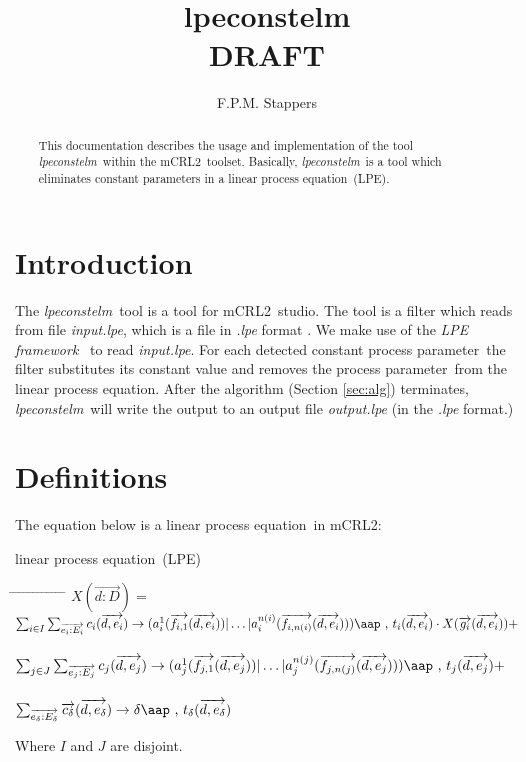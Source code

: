 \index{}\documentclass[a4paper,10pt]{article}
\title{lpeconstelm \\ DRAFT}
\author{F.P.M. Stappers}
\theoremstyle{plain}
\theoremstyle{definition}
\newcommand{\lpe}{linear process equation}
\newcommand{\tool}{\textit{lpeconstelm}}
\newcommand{\ovr}{\overrightarrow}
\newcommand{\mcrl}{mCRL2}
\newcommand{\framework}{\textit{LPE framework} \cite{LPEframework}}
\newcommand{\pp}{process parameter}
\newcommand{\ti}{\textit}
\newcommand{\tab}{\hspace*{5.mm} \= \hspace*{5.mm} \= \hspace*{5.mm} \= \hspace*{5.mm} \= \hspace*{5.mm} \= \hspace*{5.mm}  \= \hspace*{5.mm}  \= \hspace*{5.mm}  \= \hspace*{5.mm} \= \hspace*{5.mm} \= \hspace*{5.mm}  \= \hspace*{5.mm}  \= \hspace*{5.mm}\kill}
\newcommand{\at}[1]{\mbox{\aap ,} #1}
\begin{document}
\maketitle

\begin{abstract}
This documentation describes the usage and implementation of the tool \tool\ within the \mcrl\ toolset.
Basically, \tool\ is a tool which eliminates constant parameters in a \lpe\ (LPE).
\end{abstract}

\tableofcontents

\section{Introduction}
The \tool\ tool is a tool for \mcrl\ studio. The tool is a
filter which reads from file \ti{input.lpe}, which is
a file in \ti{.lpe} format \cite{LPEformat}. We make use of the
\framework\ to read \ti{input.lpe}. For
each detected constant \pp\ the filter substitutes its constant value and removes the \pp\ from the
\lpe . After the algorithm (Section \ref{sec:alg}) terminates, \tool\
will write the output to an output file \ti{output.lpe} (in the \ti{.lpe} format.)

\section{Definitions} \label{sec:def}

The equation below is a \lpe\ in \mcrl : 
\begin{defn}\lpe\ (LPE) \newline
\begin{tabbing}
\tab
$X (\ovr{d: D}) = $ \> \> \> $ \sum_{i \in I} \sum_{\ovr{e_i: E_i}} c_i ( \ovr{d, e_i }) \rightarrow 
(a_i^1 (\ovr{f_{i,1}}(\ovr{d,e_i})) \vert \ldots \vert a_i^{n(i)}(\ovr{f_{i,n(i)}}(\ovr{d,e_i}))) \at \text{ } t_i(\ovr{d,e_i})  \cdot X(\ovr{g_i}(\ovr{d,e_i})) +$ \\ \\
\> \> \> $ \sum_{j \in J} \sum_{\ovr{e_j: E_j}} c_j ( \ovr{d, e_j} ) \rightarrow 
(a_j^1 (\ovr{f_{j,1}}(\ovr{d,e_j})) \vert \ldots \vert a_j^{n(j)}(\ovr{f_{j,n(j)}}(\ovr{d,e_j}))) \at \text{ } t_j(\ovr{d,e_j}) + $ \\ \\
\> \> \> $\sum_{\ovr{e_\delta:E_\delta}} \ovr{c_\delta} ( \ovr{d, e_\delta}) \rightarrow 
\delta \at \text{ } t_\delta(\ovr{d,e_\delta})$ 
\end{tabbing}

Where $I$ and $J$ are disjoint.\\
\end{defn}
\end{document}
